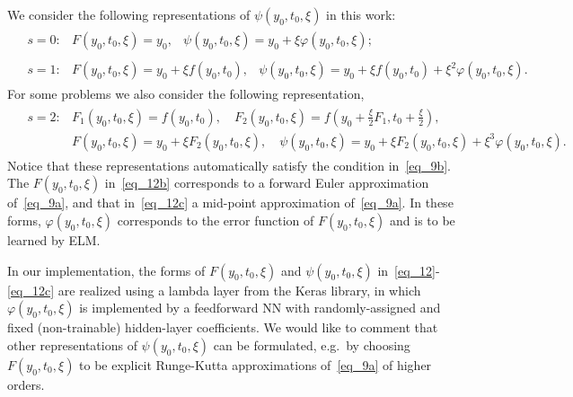 We  consider the following representations of
$\psi(y_0,t_0,\xi)$ in this work:
\begin{subequations}\label{eq_12}
  \begin{align}
    & \label{eq_12a}
  \begin{array}{lll}
    s=0: & F(y_0,t_0,\xi) = y_0, & \psi(y_0,t_0,\xi) = y_0 + \xi\varphi(y_0,t_0,\xi);
  \end{array}  \\
  & \label{eq_12b}
  \begin{array}{lll}
    s=1: & F(y_0,t_0,\xi) = y_0+\xi f(y_0,t_0),
    & \psi(y_0,t_0,\xi) = y_0 + \xi f(y_0,t_0) + \xi^2\varphi(y_0,t_0,\xi).
  \end{array}
\end{align}
\end{subequations}
%
For some problems we also consider the following representation,
\begin{align}
  & \label{eq_12c}
  \begin{array}{ll}
    s = 2: & F_1(y_0,t_0,\xi) = f(y_0,t_0), \quad
    F_2(y_0,t_0,\xi) = f(y_0+\frac{\xi}{2} F_1,t_0+\frac{\xi}{2}), \\
    & F(y_0,t_0,\xi) = y_0 + \xi F_2(y_0,t_0,\xi), \quad
     \psi(y_0,t_0,\xi) = y_0 + \xi F_2(y_0,t_0,\xi) + \xi^3\varphi(y_0,t_0,\xi).
  \end{array}
\end{align}
%
Notice that these representations automatically satisfy the condition in~\eqref{eq_9b}.
The $F(y_0,t_0,\xi)$ in~\eqref{eq_12b} corresponds to a
forward Euler approximation of~\eqref{eq_9a}, and that in~\eqref{eq_12c}
a mid-point approximation of~\eqref{eq_9a}.
In these forms, $\varphi(y_0,t_0,\xi)$ corresponds to
the error function of $F(y_0,t_0,\xi)$ and is to be learned by ELM.

\begin{remark}\label{rem_1}
  In our implementation, the forms of $F(y_0,t_0,\xi)$
  and $\psi(y_0,t_0,\xi)$ in~\eqref{eq_12}-\eqref{eq_12c}
  are realized using a
  lambda layer from the Keras library,
  in which $\varphi(y_0,t_0,\xi)$ is implemented by a
  feedforward NN  with randomly-assigned
  and fixed (non-trainable) hidden-layer coefficients.
  We would like to comment that other representations of $\psi(y_0,t_0,\xi)$
  can be formulated, e.g.~by choosing $F(y_0,t_0,\xi)$ to be explicit
  Runge-Kutta approximations of~\eqref{eq_9a} of higher orders.

\end{remark}




